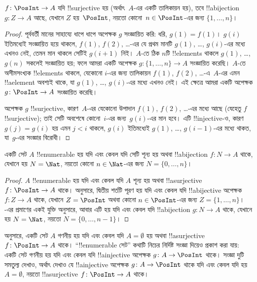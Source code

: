 \documentclass[../../../include/open-logic-section]{subfiles}
\begin{document}
\begin{prop}
$f\colon \PosInt \to A$ যদি !!{surjective} হয় (অর্থাৎ~$A$-এর একটি তালিকায়ন হয়), তবে !!a{bijection} $g\colon Z \to A$ আছে, যেখানে $Z$ হয়~$\PosInt$, নয়তো কোনো~$n \in \PosInt$-এর জন্য $\{1, \dots, n\}$।
\end{prop}

\begin{proof}
  পূর্ববর্তী মানের সাহায্যে ধাপে ধাপে অপেক্ষক $g$ সংজ্ঞায়িত করি: ধরি, $g(1) = f(1)$। $g(i)$ ইতিমধ্যেই সংজ্ঞায়িত হয়ে থাকলে, $f(1)$, $f(2)$, \dots{}-এর যে প্রথম মানটি $g(1)$, \dots, $g(i)$-এর মধ্যে এখনও নেই, তেমন মান থাকলে সেটিই $g(i+1)$ নিই। $A$-তে ঠিক $n$টি !!{element}s থাকলে $g(1)$, \dots, $g(n)$ সকলেই সংজ্ঞায়িত হয়; ফলে আমরা একটি অপেক্ষক $g\colon \{1, \dots, n\}
  \to A$ সংজ্ঞায়িত করেছি। $A$-তে অসীমসংখ্যক !!{element}s থাকলে, যেকোনো $i$-এর জন্য তালিকায়ন $f(1)$, $f(2)$, \dots{}-এ~$A$-এর এমন !!a{element} অবশ্যই থাকে, যা $g(1)$, \dots, $g(i)$-এর মধ্যে এখনও নেই। এই ক্ষেত্রে আমরা একটি অপেক্ষক $g\colon \PosInt \to A$ সংজ্ঞায়িত করেছি।

  অপেক্ষক $g$ !!{surjective}, কারণ~$A$-এর যেকোনো উপাদান $f(1)$, $f(2)$, \dots{}-এর মধ্যে আছে (যেহেতু $f$ !!{surjective}); তাই সেটি অবশেষে কোনো~$i$-এর জন্য~$g(i)$-এর মান হবে। এটি !!{injective}-ও, কারণ $g(j) = g(i)$ হয় এমন $j < i$ থাকলে, $g(i)$ ইতিমধ্যেই $g(1)$, \dots, $g(i-1)$-এর মধ্যে থাকত, যা~$g$-এর সংজ্ঞার বিরোধী।
\end{proof}

\begin{cor}
একটি সেট $A$ !!{enumerable} হয় যদি এবং কেবল যদি সেটি শূন্য হয় অথবা !!a{bijection} $f\colon N \to A$ থাকে, যেখানে হয় $N = \Nat$, নয়তো কোনো $n \in \Nat$-এর জন্য $N = \{0, \dots, n\}$।
\end{cor}

\begin{proof}
$A$ !!{enumerable} হয় যদি এবং কেবল যদি $A$ শূন্য হয় অথবা !!a{surjective} $f\colon \PosInt \to A$ থাকে।  অনুসারে, দ্বিতীয় শর্তটি পূরণ হয় যদি এবং কেবল যদি !!a{bijective} অপেক্ষক~$f\colon Z \to A$ থাকে, যেখানে $Z =
\PosInt$ অথবা কোনো $n \in \PosInt$-এর জন্য $Z = \{1, \dots, n\}$। -এর প্রমাণের একই যুক্তি অনুসারে, আবার এটি হয় যদি এবং কেবল যদি !!a{bijection} $g\colon N \to A$ থাকে, যেখানে হয় $N = \Nat$, নয়তো $N = \{0, \dots, n-1\}$।
\end{proof}

\begin{prob}
   অনুসারে, একটি সেট $A$ গণনীয় হয় যদি এবং কেবল যদি $A = \emptyset$ হয় অথবা !!a{surjective} $f\colon
  \PosInt \to A$ থাকে। ``!!{enumerable} সেট'' কথাটি নিচের নির্দিষ্ট সংজ্ঞা দিয়েও প্রকাশ করা যায়: একটি সেট গণনীয় হয় যদি এবং কেবল যদি !!a{injective} অপেক্ষক $g\colon A \to \PosInt$ থাকে। সংজ্ঞা দুটি সমতুল্য দেখাও, অর্থাৎ দেখাও যে !!a{injective} অপেক্ষক $g\colon A \to \PosInt$ থাকে যদি এবং কেবল যদি হয় $A = \emptyset$, নয়তো !!a{surjective} $f\colon \PosInt \to A$ থাকে।
\end{prob}
\end{document}
